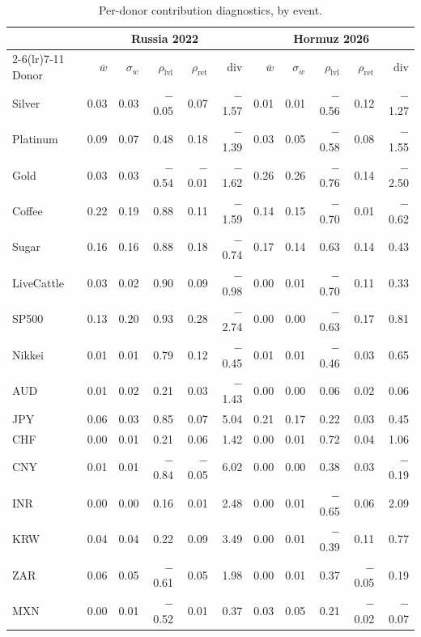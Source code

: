 \begin{table}[h]
\centering
\caption{Per-donor contribution diagnostics, by event.}
\label{tab:donorweights}
\begin{threeparttable}
\footnotesize
\setlength{\tabcolsep}{4pt}
\begin{tabular}{@{}l rrrrr rrrrr@{}}
\toprule
& \multicolumn{5}{c}{Russia 2022} & \multicolumn{5}{c}{Hormuz 2026} \\
\cmidrule(lr){2-6}\cmidrule(lr){7-11}
Donor & $\bar w$ & $\sigma_w$ & $\rho_{\text{lvl}}$ & $\rho_{\text{ret}}$ & div
      & $\bar w$ & $\sigma_w$ & $\rho_{\text{lvl}}$ & $\rho_{\text{ret}}$ & div \\
\midrule
Silver & 0.03 & 0.03 & $-$0.05 & 0.07 & $-$1.57 & 0.01 & 0.01 & $-$0.56 & 0.12 & $-$1.27 \\
Platinum & 0.09 & 0.07 & 0.48 & 0.18 & $-$1.39 & 0.03 & 0.05 & $-$0.58 & 0.08 & $-$1.55 \\
Gold & 0.03 & 0.03 & $-$0.54 & $-$0.01 & $-$1.62 & 0.26 & 0.26 & $-$0.76 & 0.14 & $-$2.50 \\
Coffee & 0.22 & 0.19 & 0.88 & 0.11 & $-$1.59 & 0.14 & 0.15 & $-$0.70 & 0.01 & $-$0.62 \\
Sugar & 0.16 & 0.16 & 0.88 & 0.18 & $-$0.74 & 0.17 & 0.14 & 0.63 & 0.14 & 0.43 \\
LiveCattle & 0.03 & 0.02 & 0.90 & 0.09 & $-$0.98 & 0.00 & 0.01 & $-$0.70 & 0.11 & 0.33 \\
SP500 & 0.13 & 0.20 & 0.93 & 0.28 & $-$2.74 & 0.00 & 0.00 & $-$0.63 & 0.17 & 0.81 \\
Nikkei & 0.01 & 0.01 & 0.79 & 0.12 & $-$0.45 & 0.01 & 0.01 & $-$0.46 & 0.03 & 0.65 \\
AUD & 0.01 & 0.02 & 0.21 & 0.03 & $-$1.43 & 0.00 & 0.00 & 0.06 & 0.02 & 0.06 \\
JPY & 0.06 & 0.03 & 0.85 & 0.07 & 5.04 & 0.21 & 0.17 & 0.22 & 0.03 & 0.45 \\
CHF & 0.00 & 0.01 & 0.21 & 0.06 & 1.42 & 0.00 & 0.01 & 0.72 & 0.04 & 1.06 \\
CNY & 0.01 & 0.01 & $-$0.84 & $-$0.05 & 6.02 & 0.00 & 0.00 & 0.38 & 0.03 & $-$0.19 \\
INR & 0.00 & 0.00 & 0.16 & 0.01 & 2.48 & 0.00 & 0.01 & $-$0.65 & 0.06 & 2.09 \\
KRW & 0.04 & 0.04 & 0.22 & 0.09 & 3.49 & 0.00 & 0.01 & $-$0.39 & 0.11 & 0.77 \\
ZAR & 0.06 & 0.05 & $-$0.61 & 0.05 & 1.98 & 0.00 & 0.01 & 0.37 & $-$0.05 & 0.19 \\
MXN & 0.00 & 0.01 & $-$0.52 & 0.01 & 0.37 & 0.03 & 0.05 & 0.21 & $-$0.02 & $-$0.07 \\

\end{tabular}
\end{threeparttable}
\end{table}
